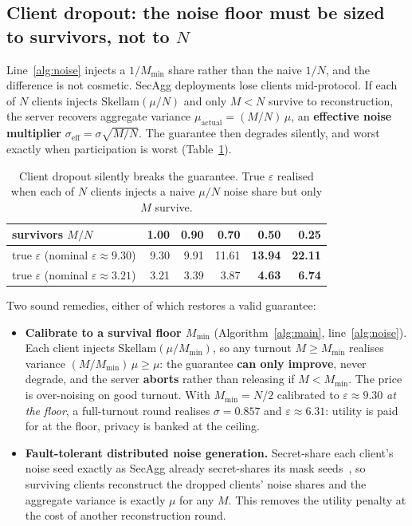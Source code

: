 \documentclass[pdflatex,sn-mathphys-num,iicol]{sn-jnl}
\theoremstyle{thmstyleone}%
\theoremstyle{thmstyletwo}%
\theoremstyle{thmstylethree}%
\newcommand{\eps}{\varepsilon}
\begin{document}
\subsection{Client dropout: the noise floor must be sized to survivors, not to
$N$}\label{sec:dropout}

Line~\ref{alg:noise} injects a $1/M_{\min}$ share rather than the naive $1/N$, and the
difference is not cosmetic. SecAgg deployments lose clients mid-protocol. If each of
$N$ clients injects $\mathrm{Skellam}(\mu/N)$ and only $M < N$ survive to
reconstruction, the server recovers aggregate variance
$\mu_{\text{actual}} = (M/N)\,\mu$, an \textbf{effective noise multiplier}
$\sigma_{\text{eff}} = \sigma\sqrt{M/N}$. The guarantee then degrades silently, and
worst exactly when participation is worst (Table~\ref{tab:dropout}).

\begin{table}[t]
  \centering
  \caption{Client dropout silently breaks the guarantee. True $\eps$ realised when
  each of $N$ clients injects a naive $\mu/N$ noise share but only $M$ survive.}
  \label{tab:dropout}
  \begin{tabular}{@{}lrrrrr@{}}
    \toprule
    survivors $M/N$ & 1.00 & 0.90 & 0.70 & 0.50 & 0.25 \\
    \midrule
    true $\eps$ (nominal $\eps \approx 9.30$) & 9.30 & 9.91 & 11.61 & \textbf{13.94} & \textbf{22.11} \\
    true $\eps$ (nominal $\eps \approx 3.21$) & 3.21 & 3.39 &  3.87 & \textbf{4.63}  & \textbf{6.74}  \\
    \bottomrule
  \end{tabular}
\end{table}

Two sound remedies, either of which restores a valid guarantee:

\begin{itemize}
  \item \textbf{Calibrate to a survival floor $M_{\min}$} (Algorithm~\ref{alg:main},
    line~\ref{alg:noise}). Each client injects $\mathrm{Skellam}(\mu / M_{\min})$, so any
    turnout $M \geq M_{\min}$ realises variance $(M/M_{\min})\,\mu \geq \mu$: the
    guarantee \textbf{can only improve}, never degrade, and the server \textbf{aborts}
    rather than releasing if $M < M_{\min}$. The price is over-noising on good turnout.
    With $M_{\min} = N/2$ calibrated to $\eps \approx 9.30$ \emph{at the floor}, a
    full-turnout round realises $\sigma = 0.857$ and $\eps \approx 6.31$: utility is
    paid for at the floor, privacy is banked at the ceiling.

  \item \textbf{Fault-tolerant distributed noise generation.} Secret-share each client's
    noise seed exactly as SecAgg already secret-shares its mask
    seeds~\cite{bonawitz2017secagg}, so surviving clients reconstruct the dropped
    clients' noise shares and the aggregate variance is exactly $\mu$ for any $M$. This
    removes the utility penalty at the cost of another reconstruction round.
\end{itemize}
\end{document}
